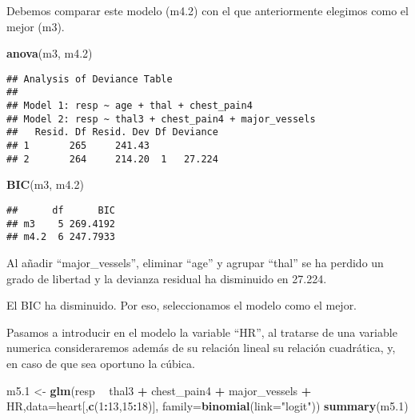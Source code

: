 \documentclass[]{article}
\newenvironment{Shaded}{\begin{snugshade}}{\end{snugshade}}
\newcommand{\KeywordTok}[1]{\textcolor[rgb]{0.13,0.29,0.53}{\textbf{#1}}}
\newcommand{\DataTypeTok}[1]{\textcolor[rgb]{0.13,0.29,0.53}{#1}}
\newcommand{\DecValTok}[1]{\textcolor[rgb]{0.00,0.00,0.81}{#1}}
\newcommand{\StringTok}[1]{\textcolor[rgb]{0.31,0.60,0.02}{#1}}
\newcommand{\OperatorTok}[1]{\textcolor[rgb]{0.81,0.36,0.00}{\textbf{#1}}}
\newcommand{\NormalTok}[1]{#1}
\begin{document}
Debemos comparar este modelo (m4.2) con el que anteriormente elegimos
como el mejor (m3).

\begin{Shaded}
\begin{Highlighting}[]
\KeywordTok{anova}\NormalTok{(m3, m4.}\DecValTok{2}\NormalTok{)}
\end{Highlighting}
\end{Shaded}

\begin{verbatim}
## Analysis of Deviance Table
## 
## Model 1: resp ~ age + thal + chest_pain4
## Model 2: resp ~ thal3 + chest_pain4 + major_vessels
##   Resid. Df Resid. Dev Df Deviance
## 1       265     241.43            
## 2       264     214.20  1   27.224
\end{verbatim}

\begin{Shaded}
\begin{Highlighting}[]
\KeywordTok{BIC}\NormalTok{(m3, m4.}\DecValTok{2}\NormalTok{)}
\end{Highlighting}
\end{Shaded}

\begin{verbatim}
##      df      BIC
## m3    5 269.4192
## m4.2  6 247.7933
\end{verbatim}

Al añadir ``major\_vessels'', eliminar ``age'' y agrupar ``thal'' se ha
perdido un grado de libertad y la devianza residual ha disminuido en
27.224.

El BIC ha disminuido. Por eso, seleccionamos el modelo como el mejor.

Pasamos a introducir en el modelo la variable ``HR'', al tratarse de una
variable numerica consideraremos además de su relación lineal su
relación cuadrática, y, en caso de que sea oportuno la cúbica.

\begin{Shaded}
\begin{Highlighting}[]
\NormalTok{m5.}\DecValTok{1}\NormalTok{ <-}\StringTok{ }\KeywordTok{glm}\NormalTok{(resp }\OperatorTok{~}\StringTok{ }\NormalTok{thal3 }\OperatorTok{+}\StringTok{ }\NormalTok{chest_pain4 }\OperatorTok{+}\StringTok{ }\NormalTok{major_vessels }\OperatorTok{+}\StringTok{ }\NormalTok{HR,}\DataTypeTok{data=}\NormalTok{heart[,}\KeywordTok{c}\NormalTok{(}\DecValTok{1}\OperatorTok{:}\DecValTok{13}\NormalTok{,}\DecValTok{15}\OperatorTok{:}\DecValTok{18}\NormalTok{)], }\DataTypeTok{family=}\KeywordTok{binomial}\NormalTok{(}\DataTypeTok{link=}\StringTok{"logit"}\NormalTok{)) }
\KeywordTok{summary}\NormalTok{(m5.}\DecValTok{1}\NormalTok{)}
\end{Highlighting}
\end{Shaded}
\end{document}
